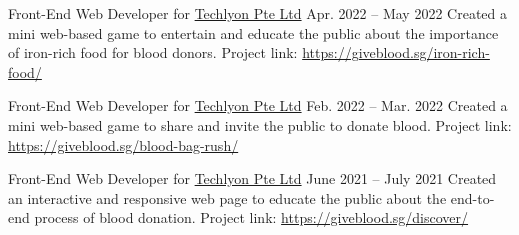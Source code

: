 \begin{cventries}



\cventry
{Front-End Web Developer for \href{https://helloakin.com/}{Techlyon Pte Ltd}} %
{} %
{} %
{Apr. 2022 -- May 2022} %
{ %
Created a mini web-based game to entertain and educate the public about the importance of iron-rich food for blood donors.
\linebreak
Project link: \href{https://giveblood.sg/iron-rich-food/}{https://giveblood.sg/iron-rich-food/}
}


\cventry
{Front-End Web Developer for \href{https://helloakin.com/}{Techlyon Pte Ltd}} %
{} %
{} %
{Feb. 2022 -- Mar. 2022} %
{ %
Created a mini web-based game to share and invite the public to donate blood.
\linebreak
Project link: \href{https://giveblood.sg/blood-bag-rush/}{https://giveblood.sg/blood-bag-rush/}
}


\cventry
{Front-End Web Developer for \href{https://helloakin.com/}{Techlyon Pte Ltd}} %
{} %
{} %
{June 2021 -- July 2021} %
{ %
Created an interactive and responsive web page to educate the public about the end-to-end process of blood donation.
\linebreak
Project link: \href{https://giveblood.sg/discover/}{https://giveblood.sg/discover/}
}



\end{cventries}
